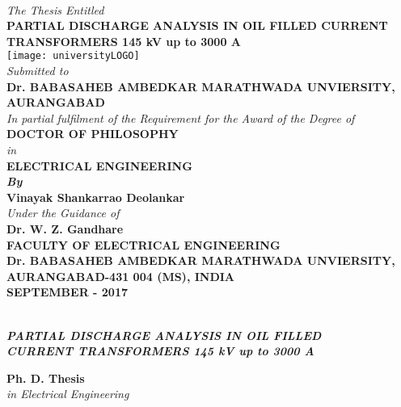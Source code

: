 \begin{center}
~\\
\textit{\small The Thesis Entitled}\\
\vspace{1cm}
\textcolor{ured}{\textbf{\large PARTIAL DISCHARGE ANALYSIS IN OIL FILLED CURRENT TRANSFORMERS 145 kV up to 3000 A}}\\
\vspace{0.5cm}
\texttt{[image: universityLOGO]}\\
\vspace{0.6cm}
\textit{\normalsize Submitted to}\\
\vspace{0.5cm}
\textcolor{ublue}{\textbf{\large Dr. BABASAHEB AMBEDKAR MARATHWADA UNVIERSITY, AURANGABAD}}\\
\vspace{1cm}
\textit{\normalsize In partial fulfilment of the Requirement for the Award of the Degree of}\\
\textbf{\large DOCTOR OF PHILOSOPHY}\\
\textit{\normalsize in}\\
\textbf{\normalsize ELECTRICAL ENGINEERING}\\
\textbf{\textit{\small By}}\\
\textcolor{ured}{\textbf{\normalsize Vinayak Shankarrao Deolankar}}\\
\textit{\normalsize Under the Guidance of}\\
\textcolor{ured}{\textbf{\large Dr. W. Z. Gandhare}}\\
\vspace{1cm}
\textbf{\normalsize FACULTY OF ELECTRICAL ENGINEERING}\\
\textbf{\large Dr. BABASAHEB AMBEDKAR MARATHWADA UNVIERSITY, AURANGABAD-431 004 (MS), INDIA\\
SEPTEMBER - 2017}
\end{center}
\clearpage
~\\
\textcolor{ured}{\textbf{\textit{\large PARTIAL DISCHARGE ANALYSIS IN OIL FILLED\\CURRENT TRANSFORMERS 145 kV up to 3000 A}}}
\vspace{2cm}

\textcolor{ublue}{\textbf{\large Ph. D. Thesis}}\\
\textit{\normalsize in Electrical Engineering}\\
\vspace{2.5cm}


